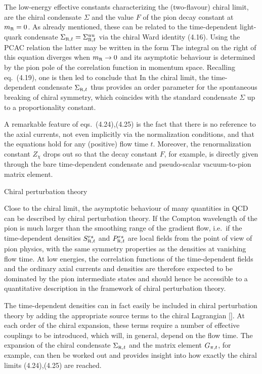 The low-energy effective constants characterizing the 
(two-flavour) chiral limit,
are the chiral condensate $\Sigma$
and the value $F$ of the pion decay constant at $\ren{m}=0$.
As already mentioned, these can be related to 
the time-dependent light-quark con\-den\-sate
$\rens{\Sigma}{t}=\rens{\Sigma}{t}^{uu}$ via
the chiral Ward identity (4.16). Using the PCAC
relation
the latter may be written in the form
The integral on the right of this equation 
diverges when $\ren{m}\to0$ and its asymptotic behaviour is determined
by the pion pole of the correlation function in momentum space.
Recalling eq.~(4.19), one is then led to conclude that
In the chiral limit, the time-dependent condensate $\rens{\Sigma}{t}$
thus provides an order parameter for the spontaneous
breaking of chiral symmetry, which coincides with the standard
condensate $\Sigma$ up to a
proportionality constant.

A remarkable feature of eqs.~(4.24),(4.25) is the fact that
there is no reference to the axial currents, not even implicitly 
via the 
normalization conditions, and that the equations hold for 
any (positive) flow time $t$.
Moreover, the renormalization constant 
$Z_{\chi}$ drops out so that the decay constant 
$F$, for example, is directly given through the bare time-dependent 
condensate and pseudo-scalar vacuum-to-pion matrix element.


 Chiral perturbation theory

Close to the chiral limit, the asymptotic behaviour of 
many quantities in QCD can be described by chiral perturbation theory.
If the Compton wavelength of the pion is much larger than
the smoothing range of the gradient flow, i.e.~if
the time-dependent densities $\rens{S}{t}^{rs}$ and $\rens{P}{t}^{rs}$
are local fields from the point of view of pion physics, with
the same symmetry properties as the densities at vanishing flow time.
At low energies, the correlation functions of the time-dependent 
fields and the ordinary axial currents and densities are
therefore expected to be dominated by the 
pion intermediate states and should hence be accessible to a quantitative
description in the framework of chiral perturbation theory.

The time-dependent densities can in fact easily be included in 
chiral perturbation theory by adding the appropriate source terms 
to the chiral Lagrangian [\cite{ChPT}]. At each order of the 
chiral expansion, these terms require a number of effective couplings
to be introduced, which will, in general, depend on the flow time.
The expansion of the chiral condensate $\rens{\Sigma}{t}$
and the matrix element $G_{\pi,t}$, for example, 
can then be worked out
and provides insight into how exactly the
chiral limits (4.24),(4.25) are reached.
